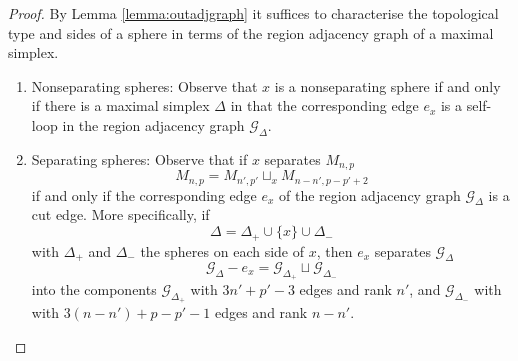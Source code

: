 \begin{proof}
    By Lemma \ref{lemma:outadjgraph}
    it suffices to characterise the topological type and sides of a sphere in terms of the region adjacency graph of a maximal simplex.
    \begin{enumerate}[$\cdot$]
    \item Nonseparating spheres:
    Observe that $x$ is a nonseparating sphere if and only if there is a maximal simplex $\Delta$ in that the corresponding edge $e_x$ is a self-loop in the region adjacency graph $\mathcal G_\Delta$.
    \item Separating spheres:
    Observe that if $x$ separates $M_{n,p}$
    $$
    M_{n,p} = M_{n',p'} \sqcup_x M_{n-n',p-p'+2}
    $$
    if and only if the corresponding edge $e_x$ of the region
    adjacency graph $\mathcal G_\Delta$ is a cut edge.
    More specifically, if
    $$
    \Delta=\Delta_+ \cup \{x\} \cup \Delta_-
    $$
     with $\Delta_+$ and $\Delta_-$ the spheres on each side of $x$,
     then $e_x$ separates $\mathcal G_\Delta$
     $$
     \mathcal G_\Delta - e_x = \mathcal G_{\Delta_+} \sqcup \mathcal G_{\Delta_-}
     $$
     into the components $\mathcal G_{\Delta_+}$
     with $3n'+p'-3$ edges and rank $n'$,
     and $\mathcal G_{\Delta_-}$ with
     with $3(n-n')+p-p'-1$ edges and rank $n-n'$.
  \end{enumerate}
\end{proof}

